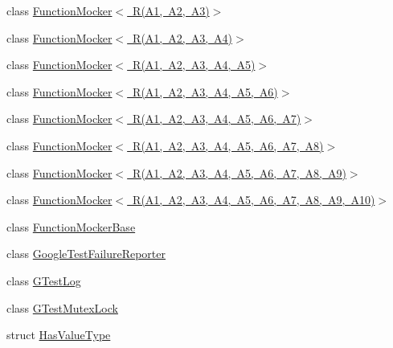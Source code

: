 \begin{DoxyCompactItemize}
\item 
class \mbox{\hyperlink{classtesting_1_1internal_1_1_function_mocker_3_01_r_07_a1_00_01_a2_00_01_a3_08_4}{Function\+Mocker$<$ R(\+A1, A2, A3)$>$}}
\item 
class \mbox{\hyperlink{classtesting_1_1internal_1_1_function_mocker_3_01_r_07_a1_00_01_a2_00_01_a3_00_01_a4_08_4}{Function\+Mocker$<$ R(\+A1, A2, A3, A4)$>$}}
\item 
class \mbox{\hyperlink{classtesting_1_1internal_1_1_function_mocker_3_01_r_07_a1_00_01_a2_00_01_a3_00_01_a4_00_01_a5_08_4}{Function\+Mocker$<$ R(\+A1, A2, A3, A4, A5)$>$}}
\item 
class \mbox{\hyperlink{classtesting_1_1internal_1_1_function_mocker_3_01_r_07_a1_00_01_a2_00_01_a3_00_01_a4_00_01_a5_00_01_a6_08_4}{Function\+Mocker$<$ R(\+A1, A2, A3, A4, A5, A6)$>$}}
\item 
class \mbox{\hyperlink{classtesting_1_1internal_1_1_function_mocker_3_01_r_07_a1_00_01_a2_00_01_a3_00_01_a4_00_01_a5_00_01_a6_00_01_a7_08_4}{Function\+Mocker$<$ R(\+A1, A2, A3, A4, A5, A6, A7)$>$}}
\item 
class \mbox{\hyperlink{classtesting_1_1internal_1_1_function_mocker_3_01_r_07_a1_00_01_a2_00_01_a3_00_01_a4_00_01_a5_00_01_a6_00_01_a7_00_01_a8_08_4}{Function\+Mocker$<$ R(\+A1, A2, A3, A4, A5, A6, A7, A8)$>$}}
\item 
class \mbox{\hyperlink{classtesting_1_1internal_1_1_function_mocker_3_01_r_07_a1_00_01_a2_00_01_a3_00_01_a4_00_01_a5_00d00d8722bf1ad86ca8049508f133d393}{Function\+Mocker$<$ R(\+A1, A2, A3, A4, A5, A6, A7, A8, A9)$>$}}
\item 
class \mbox{\hyperlink{classtesting_1_1internal_1_1_function_mocker_3_01_r_07_a1_00_01_a2_00_01_a3_00_01_a4_00_01_a5_0038b5baf41d3183579372e0e15a9db969}{Function\+Mocker$<$ R(\+A1, A2, A3, A4, A5, A6, A7, A8, A9, A10)$>$}}
\item 
class \mbox{\hyperlink{classtesting_1_1internal_1_1_function_mocker_base}{Function\+Mocker\+Base}}
\item 
class \mbox{\hyperlink{classtesting_1_1internal_1_1_google_test_failure_reporter}{Google\+Test\+Failure\+Reporter}}
\item 
class \mbox{\hyperlink{classtesting_1_1internal_1_1_g_test_log}{G\+Test\+Log}}
\item 
class \mbox{\hyperlink{classtesting_1_1internal_1_1_g_test_mutex_lock}{G\+Test\+Mutex\+Lock}}
\item 
struct \mbox{\hyperlink{structtesting_1_1internal_1_1_has_value_type}{Has\+Value\+Type}}

\end{DoxyCompactItemize}
